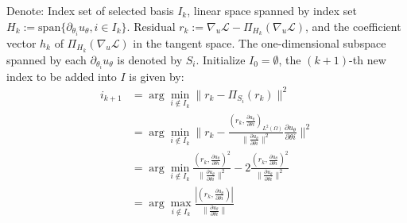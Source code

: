 \documentclass{article}
\begin{document}
Denote: Index set of selected basis $I_k$, linear space spanned by index set $H_k:=\text{span}\{\partial_{\theta_i}u_\theta, i\in I_k\}$. Residual $r_k:=\nabla_u\mathcal{L}-\Pi_{H_k}(\nabla_u\mathcal{L})$, and the coefficient vector $h_k$ of $\Pi_{H_k}(\nabla_u \mathcal{L})$ in the tangent space. The one-dimensional subspace spanned by each $\partial_{\theta_i}u_\theta$ is denoted by $S_i$. Initialize $I_0=\emptyset$, the $(k+1)$-th new index to be added into $I$ is given by:
\begin{align*}
    i_{k+1}&=\arg\min_{i\notin I_k}\|r_k-\Pi_{S_i}(r_k)\|^2 \\ 
    &= \arg\min_{i\notin I_k}\|r_k-\frac{(r_k,\frac{\partial u_\theta}{\partial\theta i})_{L^2(\Omega)}}{\|\frac{\partial u_\theta}{\partial\theta i}\|^2}\frac{\partial u_\theta}{\partial\theta i}\|^2 \\ 
    &= \arg\min_{i\notin I_k} \frac{(r_k,\frac{\partial u_\theta}{\partial\theta i})^2}{\|\frac{\partial u_\theta}{\partial\theta i}\|^2}-2\frac{(r_k,\frac{\partial u_\theta}{\partial\theta i})^2}{\|\frac{\partial u_\theta}{\partial\theta i}\|^2} \\ 
    &= \arg\max_{i\notin I_k} \frac{|(r_k,\frac{\partial u_\theta}{\partial\theta i})|}{\|\frac{\partial u_\theta}{\partial\theta i}\|} 
\end{align*}
\end{document}
